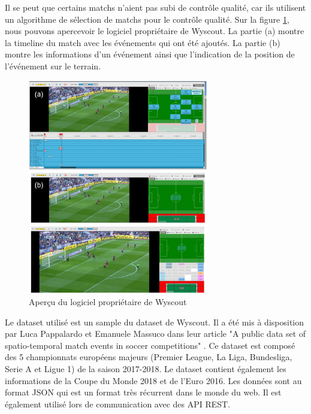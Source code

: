 \documentclass[12pt]{article}
\begin{document}
Il se peut que certains matchs n'aient pas subi de contrôle qualité, car ils utilisent un algorithme de sélection de matchs pour le contrôle qualité.
Sur la figure \ref{fig:logiciel_proprietaire}, nous pouvons apercevoir le logiciel propriétaire de Wyscout.
La partie (a) montre la timeline du match avec les événements qui ont été ajoutés.
La partie (b) montre les informations d'un événement ainsi que l'indication de la position de l'événement sur le terrain.
\begin{figure}[htp]
    \centering
    \includegraphics[width=0.7\textwidth]{img/logiciel_proprietaire.png}
    \caption{Aperçu du logiciel propriétaire de Wyscout}
    \label{fig:logiciel_proprietaire}
\end{figure}
\newline\newline
Le dataset utilisé est un sample du dataset de Wyscout. 
Il a été mis à disposition par Luca Pappalardo et Emanuele Massuco dans leur article "A public data set of spatio-temporal match events in soccer competitions" \cite{pappalardoPublicDataSet2019}.
\newline
Ce dataset est composé des 5 championnats européens majeurs (Premier League, La Liga, Bundesliga, Serie A et Ligue 1) de la saison 2017-2018. 
Le dataset contient également les informations de la Coupe du Monde 2018 et de l'Euro 2016.
Les données sont au format JSON qui est un format très récurrent dans le monde du web. Il est également utilisé lors de communication avec des API REST.
\end{document}
